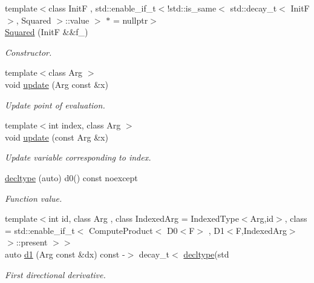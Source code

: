 \begin{DoxyCompactItemize}
\item 
{\footnotesize template$<$class Init\-F , std\-::enable\-\_\-if\-\_\-t$<$!std\-::is\-\_\-same$<$ std\-::decay\-\_\-t$<$ Init\-F $>$, Squared $>$\-::value $>$ $\ast$  = nullptr$>$ }\\\hyperlink{structFunG_1_1MathematicalOperations_1_1Squared_af786c2153ef17b5d0ddf8e0b51d060d6}{\-Squared} (\-Init\-F \&\&f\-\_\-)
\begin{DoxyCompactList}\small\item\em \-Constructor. \end{DoxyCompactList}\item 
{\footnotesize template$<$class Arg $>$ }\\void \hyperlink{structFunG_1_1MathematicalOperations_1_1Squared_abea95d90dc29ac105c43f4eadde84cab}{update} (\-Arg const \&x)
\begin{DoxyCompactList}\small\item\em \-Update point of evaluation. \end{DoxyCompactList}\item 
{\footnotesize template$<$int index, class Arg $>$ }\\void \hyperlink{structFunG_1_1MathematicalOperations_1_1Squared_a1d890825175df9b79fd73bf8248496ad}{update} (const \-Arg \&x)
\begin{DoxyCompactList}\small\item\em \-Update variable corresponding to index. \end{DoxyCompactList}\item 
\hyperlink{structFunG_1_1MathematicalOperations_1_1Squared_af0560fc3c8a6eed252dfece751a8378d}{decltype} (auto) d0() const noexcept
\begin{DoxyCompactList}\small\item\em \-Function value. \end{DoxyCompactList}\item 
{\footnotesize template$<$int id, class Arg , class Indexed\-Arg  = \-Indexed\-Type$<$\-Arg,id$>$, class  = std\-::enable\-\_\-if\-\_\-t$<$ Compute\-Product$<$ D0$<$\-F$>$ , D1$<$\-F,\-Indexed\-Arg$>$ $>$\-::present $>$$>$ }\\auto \hyperlink{structFunG_1_1MathematicalOperations_1_1Squared_a3fdd893f4a01c7b78f9eba9301d53cce}{d1} (\-Arg const \&dx) const -\/$>$ decay\-\_\-t$<$ \hyperlink{structFunG_1_1MathematicalOperations_1_1Squared_af0560fc3c8a6eed252dfece751a8378d}{decltype}(std
\begin{DoxyCompactList}\small\item\em \-First directional derivative. \end{DoxyCompactList}\item 

\end{DoxyCompactItemize}
